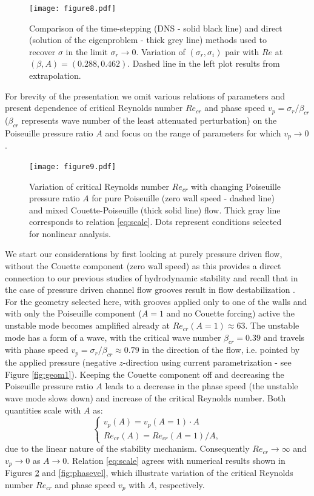 \documentclass[lineno]{jfm}
\begin{document}
\begin{figure}
\centering
	\texttt{[image: figure8.pdf]}
	\caption{Comparison of the time-stepping (DNS - solid black line) and direct (solution of the eigenproblem - thick grey line) methods used to recover $\sigma$ in the limit $\sigma_r\to0$. Variation of $(\sigma_r, \sigma_i)$ pair with $Re$ at $(\beta,A)=(0.288, 0.462)$. Dashed line in the left plot results from extrapolation.}
	\label{fig:dns_vs_tmiestep}
\end{figure}

For brevity of the presentation we omit various relations of parameters and present dependence of critical Reynolds number $Re_{cr}$ and phase speed $v_{p}=\sigma_r / \beta_{cr}$ ($\beta_{cr}$ represents wave number of the least attenuated perturbation) on the  Poiseuille pressure ratio $A$ and focus on the range of parameters for which $v_p\to0$.

\begin{figure}
\centering
	\texttt{[image: figure9.pdf]}  
	\caption{Variation of critical Reynolds number $Re_{cr}$ with changing Poiseuille pressure ratio $A$ for pure Poiseuille (zero wall speed - dashed line) and mixed Couette-Poiseuille (thick solid line) flow. Thick gray line corresponds to relation \eqref{eq:scale}. Dots represent conditions selected for nonlinear analysis.}
	\label{fig:recrit}
\end{figure}

We start our considerations by first looking at purely pressure driven flow, without the Couette component (zero wall speed) as this provides a direct connection to our previous studies of hydrodynamic stability and recall that in the case of pressure driven channel flow grooves result in flow destabilization \citep{Nikesh2017}.
For the geometry selected here, with grooves applied only to one of the walls and with only the Poiseuille component ($A=1$ and no Couette forcing) active the unstable mode becomes amplified already at $Re_{cr}(A=1)\approx63$.
The unstable mode has a form of a wave, with the critical wave number $\beta_{cr}=0.39$ and travels with phase speed $v_{p}={\sigma_{r}}/{\beta_{cr}}\approx0.79$ in the direction of the flow, i.e. pointed by the applied pressure (negative $z$-direction using current parametrization - see Figure \ref{fig:geom1}).
Keeping the Couette component off and decreasing the Poiseuille pressure ratio $A$ leads to a decrease in the phase speed (the unstable wave mode slows down) and increase of the critical Reynolds number.
Both quantities scale with $A$ as:
\begin{equation}
    \begin{cases}
        v_{p}(A) = v_p(A=1)\cdot A \\
        Re_{cr}(A)=Re_{cr}(A=1)/A,
    \end{cases}
    \label{eq:scale}
\end{equation}
due to the linear nature of the stability mechanism.
Consequently $Re_{cr}\to\infty$ and $v_p\to0$ as $A\to0$.
Relation \eqref{eq:scale} agrees with numerical results shown in Figures \ref{fig:recrit} and \ref{fig:phasevel}, which illustrate variation of the critical Reynolds number $Re_{cr}$ and phase speed $v_p$ with $A$, respectively.
\end{document}

